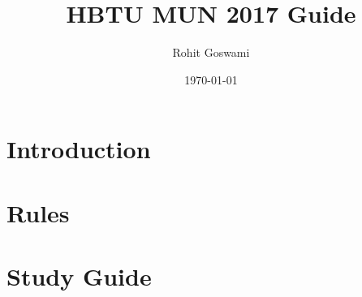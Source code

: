 \documentclass[11pt]{report}              %
\title{\bf HBTU MUN 2017 Guide}    %
\author{Rohit Goswami}              %
\date{\today}                           %
\begin{document}
\maketitle                              %
\tableofcontents                        %
\part{Introduction}                   %



\part{Rules}

\part{Study Guide}

\begin{appendices}
\end{appendices}
\printglossary
\end{document}
